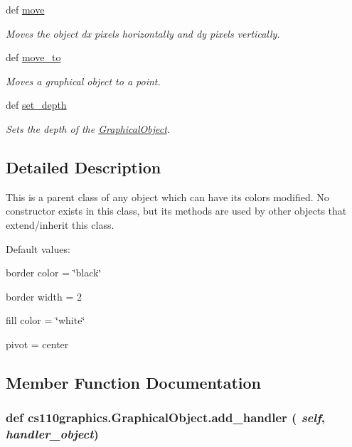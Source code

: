 \begin{DoxyCompactItemize}
def \hyperlink{classcs110graphics_1_1GraphicalObject_aa64d270fb83efa4a54e1a7953512f9cd}{move}
\begin{DoxyCompactList}\small\item\em Moves the object dx pixels horizontally and dy pixels vertically. \item\end{DoxyCompactList}\item 
def \hyperlink{classcs110graphics_1_1GraphicalObject_abe2d480265df7ac9447205c52c6946df}{move\_\-to}
\begin{DoxyCompactList}\small\item\em Moves a graphical object to a point. \item\end{DoxyCompactList}\item 
def \hyperlink{classcs110graphics_1_1GraphicalObject_a20d76d4ee4419c3065d61deb6cbc6700}{set\_\-depth}
\begin{DoxyCompactList}\small\item\em Sets the depth of the \hyperlink{classcs110graphics_1_1GraphicalObject}{GraphicalObject}. \item\end{DoxyCompactList}\end{DoxyCompactItemize}


\subsection{Detailed Description}
This is a parent class of any object which can have its colors modified. No constructor exists in this class, but its methods are used by other objects that extend/inherit this class.

Default values:
\begin{DoxyItemize}
\item border color = \char`\"{}black\char`\"{}
\item border width = 2
\item fill color = \char`\"{}white\char`\"{}
\item pivot = center 
\end{DoxyItemize}

\subsection{Member Function Documentation}
\hypertarget{classcs110graphics_1_1GraphicalObject_adb1af0d5a6baae3f9a08d21a3227c49f}{
\subsubsection[{add\_\-handler}]{\setlength{\rightskip}{0pt plus 5cm}def cs110graphics.GraphicalObject.add\_\-handler ( {\em self}, \/   {\em handler\_\-object})}}
\label{classcs110graphics_1_1GraphicalObject_adb1af0d5a6baae3f9a08d21a3227c49f}


